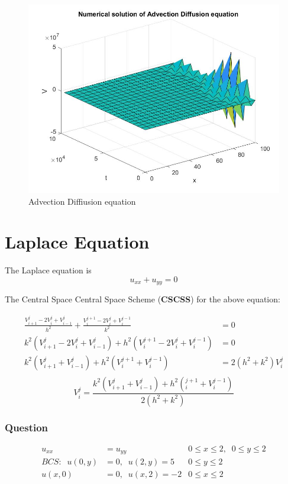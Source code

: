 \documentclass[a4paper,14pt,twoside,onecolumn,openany,final]{memoir}
\begin{document}
\begin{figure}
  \includegraphics[scale=0.4]{advection.jpg}
  \caption{Advection Diffiusion equation}
\end{figure}
\chapter{Laplace Equation}

The Laplace equation is
\[ u_{xx}+u_{yy}=0 \]

The Central Space Central Space Scheme (\textbf{CSCSS}) for the above equation:

\begin{align*}
  \frac{V_{i+1}^j-2V_i^j+V_{i-1}^j}{h^2} + \frac{V_i^{j+1}-2V_i^j+V_i^{j-1}}{k^2} &= 0\\
  k^2(V_{i+1}^j-2V_i^j+V_{i-1}^j) + h^2(V_i^{j+1}-2V_i^j+V_i^{j-1}) &= 0\\
  k^2(V_{i+1}^j+V_{i-1}^j) + h^2(V_i^{j+1}+V_i^{j-1}) &= 2(h^2+k^2)V_i^j\\
\end{align*}
\begin{equation}
  V_i^j = \frac{k^2(V_{i+1}^j+V_{i-1}^j)+h^2(_i^{j+1}+V_i^{j-1})}{2(h^2+k^2)}
\end{equation}

\subsection{Question}
\begin{align*}
    u_{xx}&=u_{yy}           &   0\leq x \leq 2,\;\; 0 \leq y \leq 2\\
    BCS:\;\; u(0,y)&=0, \;\; u(2,y)=5   &   0\leq y \leq 2\\
             u(x,0)&=0, \;\; u(x,2)=-2  &   0\leq x \leq 2
\end{align*}
\clearpage
\end{document}
